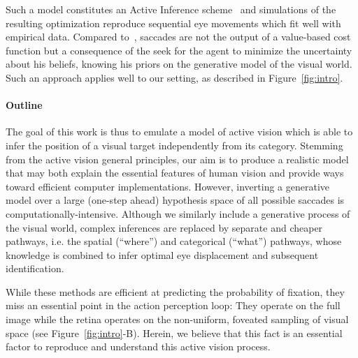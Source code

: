 Such a model constitutes an Active Inference scheme~\citep{Mirza18} and simulations of the resulting optimization reproduce sequential eye movements which fit well with empirical data. Compared to~\citet{Najemnik05}, saccades are not the output of a value-based cost function but a consequence of the seek for the agent to minimize the uncertainty about his beliefs, knowing his priors on the generative model of the visual world. Such an approach applies well to our setting, as described in Figure~\ref{fig:intro}. 



\paragraph{Outline}
The goal of this work is thus to emulate a model of active vision which is able to infer the position of a visual target independently from its category.
Stemming from the active vision general principles, our aim is to produce a realistic model that may both explain the essential features of human vision and provide ways toward efficient computer implementations.
However, inverting a generative model over a large (one-step ahead) hypothesis space of all possible saccades is computationally-intensive. %
Although we similarly include a generative process of the visual world, complex inferences are replaced by separate and cheaper pathways, i.e. the spatial (``where'') and categorical (``what'') pathways, whose knowledge is combined to infer optimal eye displacement and subsequent identification.    

While these methods are efficient at predicting the probability of fixation, they miss an essential point in the action perception loop: They operate on the full image while the retina operates on the non-uniform, foveated sampling of visual space (see Figure~\ref{fig:intro}-B). Herein, we believe that this fact is an essential factor to reproduce and understand this active vision process.

